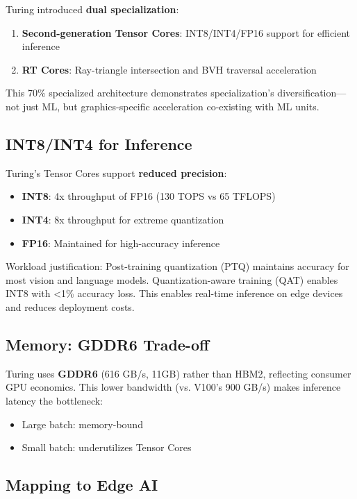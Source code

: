 \documentclass{article}
\begin{document}
Turing introduced \textbf{dual specialization}:
\begin{enumerate}
\item \textbf{Second-generation Tensor Cores}: INT8/INT4/FP16 support for efficient inference
\item \textbf{RT Cores}: Ray-triangle intersection and BVH traversal acceleration
\end{enumerate}

This 70\% specialized architecture demonstrates specialization's diversification—not just ML, but graphics-specific acceleration co-existing with ML units.

\subsection{INT8/INT4 for Inference}

Turing's Tensor Cores support \textbf{reduced precision}:
\begin{itemize}
\item \textbf{INT8}: 4x throughput of FP16 (130 TOPS vs 65 TFLOPS)
\item \textbf{INT4}: 8x throughput for extreme quantization
\item \textbf{FP16}: Maintained for high-accuracy inference
\end{itemize}

Workload justification: Post-training quantization (PTQ) maintains accuracy for most vision and language models. Quantization-aware training (QAT) enables INT8 with <1\% accuracy loss. This enables real-time inference on edge devices and reduces deployment costs.

\subsection{Memory: GDDR6 Trade-off}

Turing uses \textbf{GDDR6} (616 GB/s, 11GB) rather than HBM2, reflecting consumer GPU economics. This lower bandwidth (vs. V100's 900 GB/s) makes inference latency the bottleneck:
\begin{itemize}
\item Large batch: memory-bound
\item Small batch: underutilizes Tensor Cores
\end{itemize}

\subsection{Mapping to Edge AI}
\end{document}
